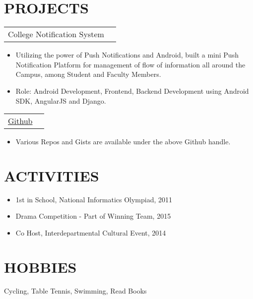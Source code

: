 \documentclass[margin]{res}
\begin{document}
\begin{resume}
\section{PROJECTS}
				 \begin{tabular}{p{5in} r} %
                 College Notification System
                 \end{tabular}
                  \begin{itemize}
                   \item[] Utilizing the power of Push Notifications and Android, built a mini Push Notification Platform for management of flow of information all around the Campus, among Student and Faculty Members.
                   \item[] Role: Android Development, Frontend, Backend Development using Android SDK, AngularJS and Django.
                  \end{itemize}
				 \begin{tabular}{p{5in} r} %
                 \href {www.github.com/SehgalDivij}{Github}
                 \end{tabular}
                  \begin{itemize}
                   \item[] Various Repos and Gists are available under the above Github handle.
                  \end{itemize}
\section{ACTIVITIES}
 \begin{itemize}
 \item 1st in School, National Informatics Olympiad, 2011
 \end{itemize}
  \begin{itemize}
 \item Drama Competition - Part of Winning Team, 2015
 \end{itemize}
  \begin{itemize}
 \item Co Host, Interdepartmental Cultural Event, 2014
 \end{itemize}
 
\section{HOBBIES}         Cycling, Table Tennis, Swimming, Read Books
 
\end{resume} 
\end{document}
